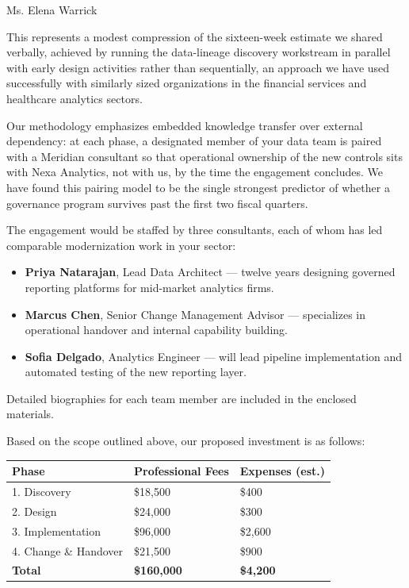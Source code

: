 \documentclass[a4paper,11pt]{scrletter}
\begin{document}
\begin{letter}{Ms. Elena Warrick}
\vspace{0.4cm}

This represents a modest compression of the sixteen-week estimate we shared verbally, achieved by running the data-lineage discovery workstream in parallel with early design activities rather than sequentially, an approach we have used successfully with similarly sized organizations in the financial services and healthcare analytics sectors.

Our methodology emphasizes embedded knowledge transfer over external dependency: at each phase, a designated member of your data team is paired with a Meridian consultant so that operational ownership of the new controls sits with Nexa Analytics, not with us, by the time the engagement concludes. We have found this pairing model to be the single strongest predictor of whether a governance program survives past the first two fiscal quarters.

\pagebreak

The engagement would be staffed by three consultants, each of whom has led comparable modernization work in your sector:

\begin{itemize}[leftmargin=1.4em,itemsep=4pt,topsep=4pt]
  \item \textbf{Priya Natarajan}, Lead Data Architect --- twelve years designing governed reporting platforms for mid-market analytics firms.
  \item \textbf{Marcus Chen}, Senior Change Management Advisor --- specializes in operational handover and internal capability building.
  \item \textbf{Sofia Delgado}, Analytics Engineer --- will lead pipeline implementation and automated testing of the new reporting layer.
\end{itemize}

Detailed biographies for each team member are included in the enclosed materials.

Based on the scope outlined above, our proposed investment is as follows:

\vspace{0.3cm}

\begin{tabular}{@{}p{4.0cm}>{\raggedleft\arraybackslash}p{3.1cm}>{\raggedleft\arraybackslash}p{2.6cm}@{}}
\toprule
\textbf{Phase} & \textbf{Professional Fees} & \textbf{Expenses (est.)} \\
\midrule
1. Discovery & \$18,500 & \$400 \\
2. Design & \$24,000 & \$300 \\
3. Implementation & \$96,000 & \$2,600 \\
4. Change \& Handover & \$21,500 & \$900 \\
\midrule
\rowcolor{softgray}
\textbf{Total} & \textbf{\$160,000} & \textbf{\$4,200} \\
\bottomrule
\end{tabular}


\end{letter}
\end{document}
